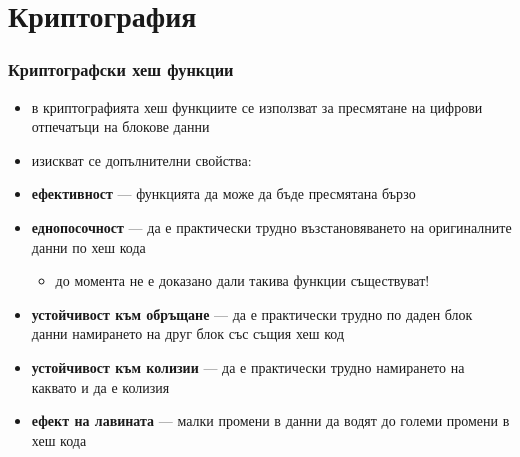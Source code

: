 \documentclass[alsotrans,beameroptions={aspectratio=169}]{beamerswitch}
\begin{document}
\section{Криптография}

\begin{frame}
  \frametitle{Криптографски хеш функции}
  \begin{itemize}[<+->]
  \item в криптографията хеш функциите се използват за пресмятане на
    цифрови отпечатъци на блокове данни
  \item изискват се допълнителни свойства:
  \item \textbf{ефективност} ---  функцията да може да бъде пресмятана бързо
  \item \textbf{еднопосочност} ---  да е практически трудно възстановяването на оригиналните данни по хеш кода
    \begin{itemize}
    \item \alert{до момента не е доказано дали такива функции съществуват!}
    \end{itemize}
  \item \textbf{устойчивост към обръщане} --- да е практически трудно по даден блок данни намирането на друг блок със същия хеш код
  \item \textbf{устойчивост към колизии} --- да е практически трудно намирането на каквато и да е колизия
  \item \textbf{ефект на лавината} --- малки промени в данни да водят до големи промени в хеш кода
  \end{itemize}
\end{frame}
\end{document}
